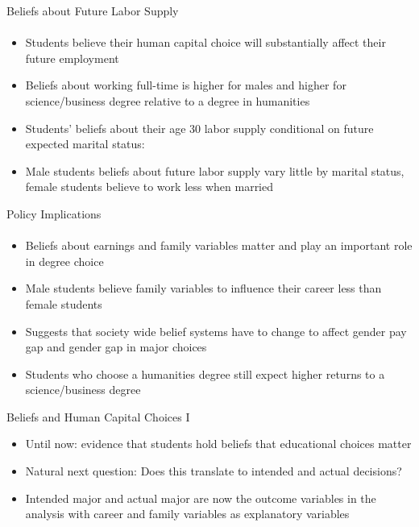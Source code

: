 \documentclass[12pt]{beamer}
\begin{document}
\begin{frame}{Beliefs about Future Labor Supply}
    \framesubtitle{} 
    \begin{itemize}
        \item Students believe their human capital choice will substantially affect their future employment
        \item Beliefs about working full-time is higher for males and higher for science/business degree relative to a degree in humanities
        \item Students' beliefs about their age 30 labor supply conditional on future expected marital status:
        \item Male students beliefs about future labor supply vary little by marital status, female students believe to work less when married
    \end{itemize}
\end{frame}

\begin{frame}{Policy Implications}
    \framesubtitle{} 
    \begin{itemize}
        \item Beliefs about earnings and family variables matter and play an important role in degree choice 
        \item Male students believe family variables to influence their career less than female students  
        \item Suggests that society wide belief systems have to change to affect gender pay gap and gender gap in major choices 
        \item Students who choose a humanities degree still expect higher returns to a science/business degree
    \end{itemize}
\end{frame}

\begin{frame}{Beliefs and Human Capital Choices I}
    \begin{itemize}
        \item Until now: evidence that students hold beliefs that educational choices matter
        \item Natural next question: Does this translate to intended and actual decisions?
        \item Intended major and actual major are now the outcome variables in the analysis with career and family variables as explanatory variables
    \end{itemize}  
\end{frame}
\end{document}

